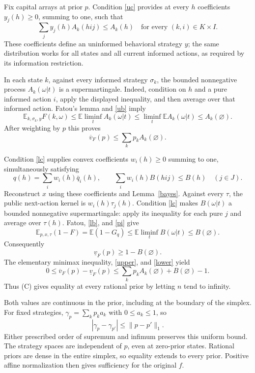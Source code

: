 \documentclass[11pt,a4paper]{article}
\theoremstyle{definition}
\newcommand{\E}{\mathbb E}
\newcommand{\lv}{\underline v}
\newcommand{\uv}{\overline v}
\begin{document}
Fix capital arrays at prior $p$. Condition \eqref{uc} provides at every
$h$ coefficients $y_j(h)\geq0$, summing to one, such that
\[
 \sum_j y_j(h)A_k(hij)\leq A_k(h)
 \quad\text{for every }(k,i)\in K\times I.
\]
These coefficients define an uninformed behavioral strategy $y$; the
same distribution works for all states and all current informed
actions, as required by its information restriction.

In each state $k$, against every informed strategy $\sigma_k$, the
bounded nonnegative process $A_k(\omega|t)$ is a supermartingale.
Indeed, condition on $h$ and a pure informed action $i$, apply the
displayed inequality, and then average over that informed action.
Fatou's lemma and \eqref{ub} imply
\[
 \E_{k,\sigma_k,y}F(k,\omega)
 \leq\E\liminf_t A_k(\omega|t)
 \leq\liminf_t\E A_k(\omega|t)
 \leq A_k(\varnothing).
\]
After weighting by $p$ this proves
\begin{equation}
 \uv_F(p)\leq\sum_k p_k A_k(\varnothing).
 \label{upper}
\end{equation}

Condition \eqref{lc} supplies convex coefficients $w_i(h)\geq0$ summing
to one, simultaneously satisfying
\[
 q(h)=\sum_i w_i(h)\bar q_i(h),\qquad
 \sum_i w_i(h)B(hij)\leq B(h)\quad(j\in J).
\]
Reconstruct $x$ using these coefficients and Lemma~\ref{bayes}. Against every
$\tau$, the public next-action kernel is
$w_i(h)\tau_j(h)$. Condition \eqref{lc} makes $B(\omega|t)$ a bounded
nonnegative supermartingale: apply its inequality for each pure $j$
and average over $\tau(h)$. Fatou, \eqref{lb}, and \eqref{pi} give
\[
 \E_{p,x,\tau}(1-F)=\E(1-G_q)
 \leq\E\liminf_t B(\omega|t)\leq B(\varnothing).
\]
Consequently
\begin{equation}
 \lv_F(p)\geq1-B(\varnothing).
 \label{lower}
\end{equation}
The elementary minimax inequality, \eqref{upper}, and \eqref{lower}
yield
\begin{equation}
 0\leq\uv_F(p)-\lv_F(p)
 \leq\sum_k p_k A_k(\varnothing)+B(\varnothing)-1.
 \label{gapbound}
\end{equation}
Thus (C) gives equality at every rational prior by letting $n$ tend to
infinity.

Both values are continuous in the prior, including at the boundary of
the simplex. For fixed strategies,
$\gamma_p=\sum_k p_k a_k$ with $0\leq a_k\leq1$, so
\[
 |\gamma_p-\gamma_{p'}|\leq\|p-p'\|_1.
\]
Either prescribed order of supremum and infimum preserves this uniform
bound. The strategy spaces are independent of $p$, even at zero-prior
states. Rational priors are dense in the entire simplex, so equality
extends to every prior. Positive affine normalization then gives
sufficiency for the original $f$.
\end{document}

